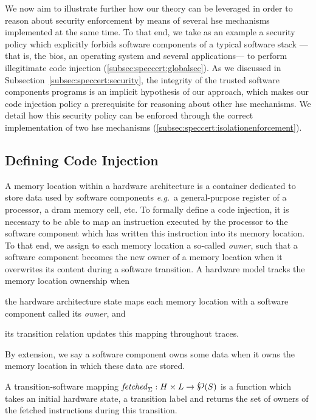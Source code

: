 We now aim to illustrate further how our theory can be leveraged in order to
reason about security enforcement by means of several \ac{hse} mechanisms
implemented at the same time.
%
To that end, we take as an example a security policy which explicitly forbids
software components of a typical software stack ---that is, the \ac{bios}, an
operating system and several applications--- to perform illegitimate code
injection (\ref{subsec:speccert:globalsec}).
%
As we discussed in Subsection~\ref{subsec:speccert:security}, the integrity of
the trusted software components programs is an implicit hypothesis of our
approach, which makes our code injection policy a prerequisite for reasoning
about other \ac{hse} mechanisms.
%
We detail how this security policy can be enforced through the correct
implementation of two \ac{hse} mechanisms
(\ref{subsec:speccert:isolationenforcement}).

\subsection{Defining Code Injection}
\label{subsec:speccert:tampering}

A memory location within a hardware architecture is a container dedicated to
store data used by software components \emph{e.g.}~a general-purpose register of
a processor, a \ac{dram} memory cell, etc.
%
To formally define a code injection, it is necessary to be able to map an
instruction executed by the processor to the software component which has
written this instruction into its memory location.
%
To that end, we assign to each memory location a so-called \emph{owner}, such
that a software component becomes the new owner of a memory location when it
overwrites its content during a software transition.
%
A hardware model tracks the memory location ownership when
%
\begin{inparaenum}[(1)]
\item the hardware architecture state maps each memory location with a software
  component called its \emph{owner}, and
%
\item its transition relation updates this mapping throughout traces.
\end{inparaenum}
%
By extension, we say a software component owns some data when it owns the memory
location in which these data are stored.

\begin{definition}
  \label{def:speccert:transsoft}
  A transition-software mapping
  $\func{fetched}_{\Sigma}: H \times L \rightarrow \powerset(S)$ is a function
  which takes an initial hardware state, a transition label and returns the set
  of owners of the fetched instructions during this transition.
\end{definition}

